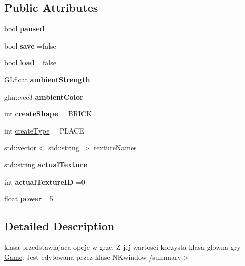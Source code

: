 \subsection*{Public Attributes}
\begin{DoxyCompactItemize}
\item 
\mbox{\label{class_options_a200bd73d95e481268e8af998682259fa}} 
bool {\bfseries paused}
\item 
\mbox{\label{class_options_ab1617285c57360aa3ad7c97497180cda}} 
bool {\bfseries save} =false
\item 
\mbox{\label{class_options_a2530dbc672ce950c83419b1499f744e5}} 
bool {\bfseries load} =false
\item 
\mbox{\label{class_options_a29188c90678b35632ab6ba78bb2dc5f5}} 
G\+Lfloat {\bfseries ambient\+Strength}
\item 
\mbox{\label{class_options_aad941c1d1e38733a2da0d106a2b42900}} 
glm\+::vec3 {\bfseries ambient\+Color}
\item 
\mbox{\label{class_options_a0c249572242c1ad85b96f98c3e733a8e}} 
int {\bfseries create\+Shape} = B\+R\+I\+CK
\item 
int \hyperlink{class_options_abf0c0bd98f610208b37d5ccc29986c12}{create\+Type} = P\+L\+A\+CE
\item 
std\+::vector$<$ std\+::string $>$ \hyperlink{class_options_a1302853b860cb9384f79253c8ff13965}{texture\+Names}
\item 
\mbox{\label{class_options_afc122ce401f77ffe11316e5412eb69ce}} 
std\+::string {\bfseries actual\+Texture}
\item 
\mbox{\label{class_options_ae0768e34daf66c942ed92ee3481bc806}} 
int {\bfseries actual\+Texture\+ID} =0
\item 
\mbox{\label{class_options_a7db76294fe05468adaa599a9d88ec894}} 
float {\bfseries power} =5.
\end{DoxyCompactItemize}


\subsection{Detailed Description}
klasa przedstawiajaca opcje w grze. Z jej wartosci korzysta klasa glowna gry \hyperlink{class_game}{Game}. Jest edytowana przez klase N\+Kwindow /summary$>$ 

